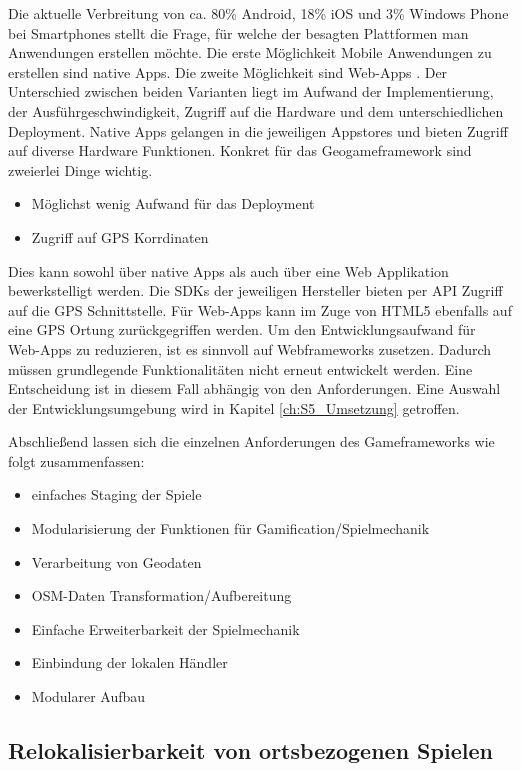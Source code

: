 Die aktuelle Verbreitung von ca. 80\% Android, 18\% iOS und 3\% Windows Phone bei Smartphones stellt die Frage, für welche der besagten Plattformen man Anwendungen erstellen möchte.
Die erste Möglichkeit Mobile Anwendungen zu erstellen sind native Apps. Die zweite Möglichkeit sind Web-Apps \cite{Charland.2011}.
Der Unterschied zwischen beiden Varianten liegt im Aufwand der Implementierung, der Ausführgeschwindigkeit, Zugriff auf die Hardware und dem unterschiedlichen Deployment.
Native Apps gelangen in die jeweiligen Appstores und bieten Zugriff auf diverse Hardware Funktionen.
Konkret für das Geogameframework sind zweierlei Dinge wichtig.

\begin{itemize}
\item Möglichst wenig Aufwand für das Deployment
\item Zugriff auf GPS Korrdinaten
\end{itemize}

Dies kann sowohl über native  Apps als auch über eine Web Applikation bewerkstelligt werden. Die SDKs der jeweiligen Hersteller bieten per API Zugriff auf die GPS Schnittstelle. Für Web-Apps kann im Zuge von HTML5 ebenfalls auf eine GPS Ortung zurückgegriffen werden.\cite{Holdener.2011}
Um den Entwicklungsaufwand für Web-Apps zu reduzieren, ist es sinnvoll auf Webframeworks zusetzen. Dadurch müssen grundlegende Funktionalitäten nicht erneut entwickelt werden.
Eine Entscheidung ist in diesem Fall abhängig von den Anforderungen. Eine Auswahl der Entwicklungsumgebung wird in Kapitel \ref{ch:S5_Umsetzung} getroffen.

Abschließend lassen sich die einzelnen Anforderungen des Gameframeworks wie folgt zusammenfassen:

\begin{itemize}
\item einfaches Staging der Spiele
\item Modularisierung der Funktionen für Gamification/Spielmechanik
\item Verarbeitung von Geodaten
\item OSM-Daten Transformation/Aufbereitung
\item Einfache Erweiterbarkeit der Spielmechanik
\item Einbindung der lokalen Händler
\item Modularer Aufbau
\end{itemize}


\subsection*{Relokalisierbarkeit von ortsbezogenen Spielen}

